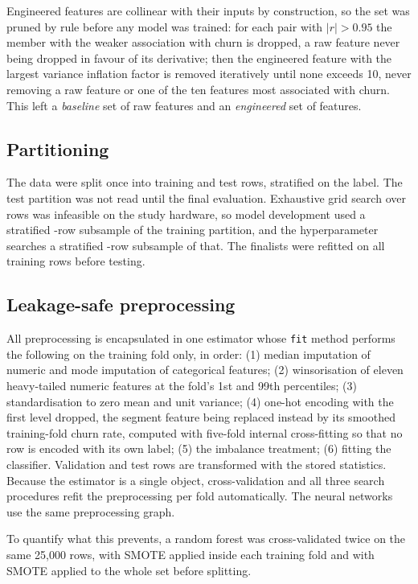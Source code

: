 \documentclass[conference]{IEEEtran}
\begin{document}
Engineered features are collinear with their inputs by construction, so the set was pruned by rule before any model was trained: for each pair with $|r|>0.95$ the member with the weaker association with churn is dropped, a raw feature never being dropped in favour of its derivative; then the engineered feature with the largest variance inflation factor is removed iteratively until none exceeds 10, never removing a raw feature or one of the ten features most associated with churn. This left a \emph{baseline} set of \NBaseline{} raw features and an \emph{engineered} set of \NEngSet{} features.

\subsection{Partitioning}
The data were split once into \NTrain{} training and \NTest{} test rows, stratified on the label. The test partition was not read until the final evaluation. Exhaustive grid search over \NTrain{} rows was infeasible on the study hardware, so model development used a stratified \NDev{}-row subsample of the training partition, and the hyperparameter searches a stratified \NTune{}-row subsample of that. The finalists were refitted on all \NTrain{} training rows before testing.

\subsection{Leakage-safe preprocessing}\label{sec:prep}
All preprocessing is encapsulated in one estimator whose \texttt{fit} method performs the following on the training fold only, in order: (1) median imputation of numeric and mode imputation of categorical features; (2) winsorisation of eleven heavy-tailed numeric features at the fold's 1st and 99th percentiles; (3) standardisation to zero mean and unit variance; (4) one-hot encoding with the first level dropped, the segment feature being replaced instead by its smoothed training-fold churn rate, computed with five-fold internal cross-fitting so that no row is encoded with its own label; (5) the imbalance treatment; (6) fitting the classifier. Validation and test rows are transformed with the stored statistics. Because the estimator is a single object, cross-validation and all three search procedures refit the preprocessing per fold automatically. The neural networks use the same preprocessing graph.

To quantify what this prevents, a random forest was cross-validated twice on the same 25,000 rows, with SMOTE applied inside each training fold and with SMOTE applied to the whole set before splitting.
\end{document}
